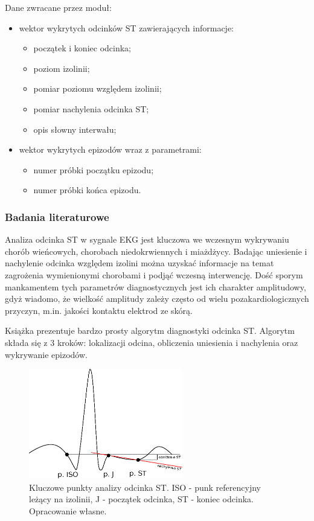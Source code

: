 \documentclass[a4paper, 11pt]{article}
\begin{document}
Dane zwracane przez moduł:
\begin{itemize}
  \item wektor wykrytych odcinków ST zawierających informacje:
  \begin{itemize}
    \item początek i koniec odcinka;
    \item poziom izolinii;
    \item pomiar poziomu względem izolinii;
    \item pomiar nachylenia odcinka ST;
    \item opis słowny interwału;
  \end{itemize}
  \item wektor wykrytych epizodów wraz z parametrami:
  \begin{itemize}
    \item numer próbki początku epizodu;
    \item numer próbki końca epizodu.
  \end{itemize}
\end{itemize}

\subsubsection{Badania literaturowe}
\label{sec:st_interval:papers}

Analiza odcinka ST w sygnale EKG jest kluczowa we wczesnym wykrywaniu chorób
wieńcowych, chorobach niedokrwiennych i miażdżycy. Badając uniesienie i
nachylenie odcinka względem izolini można uzyskać informacje na temat
zagrożenia wymienionymi chorobami i podjąć wczesną interwencję. Dość sporym
mankamentem tych parametrów diagnostycznych jest ich charakter amplitudowy,
gdyż wiadomo, że wielkość amplitudy zależy często od wielu pozakardiologicznych
przyczyn, m.in. jakości kontaktu elektrod ze skórą.

Książka \cite{AUGUST1} prezentuje bardzo prosty algorytm diagnostyki odcinka
ST. Algorytm składa się z 3 kroków: lokalizacji odcina, obliczenia uniesienia i
nachylenia oraz wykrywanie epizodów.

\begin{figure}[h!]
  \centering
  \includegraphics[width=0.6\textwidth]{include/ecg_st}
  \caption{Kluczowe punkty analizy odcinka ST. ISO - punk referencyjny leżący
  na izolinii, J - początek odcinka, ST - koniec odcinka. Opracowanie własne.}
  \label{fig:ecg_st}
\end{figure}
\end{document}
